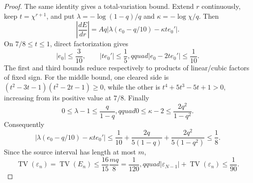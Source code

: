\begin{proof}
The same identity gives a total-variation bound.  Extend $r$ continuously,
keep $t=\chi^{r+1}$, and put
$\lambda=-\log(1-q)/q$ and $\kappa=-\log\chi/q$.  Then
\begin{equation}
 \left|\frac{dE}{dr}\right|
 =Aq\left|\lambda(e_0-q/10)-\kappa t e_0'\right|.
\end{equation}
On $7/8\le t\le1$, direct factorization gives
\begin{equation}
 |e_0|\le\frac3{10},\qquad |te_0'|\le\frac15,qquad
 |e_0-2te_0'|\le\frac1{10}.
\end{equation}
The first and third bounds reduce respectively to products of linear/cubic
factors of fixed sign.  For the middle bound, one cleared side is
$(t^2-3t-1)(t^2-2t-1)\ge0$, while the other is
$t^4+5t^3-5t+1>0$, increasing from its positive value at $7/8$.
Finally
\[
 0\le\lambda-1\le\frac q{1-q},qquad
 0\le\kappa-2\le\frac{2q^2}{1-q^2}.
\]
Consequently
\[
 \left|\lambda(e_0-q/10)-\kappa te_0'\right|
 \le\frac1{10}+\frac{2q}{5(1-q)}
 +\frac{2q^2}{5(1-q^2)}\le\frac18.
\]
Since the source interval has length at most $m$,
\begin{equation}
 \operatorname{TV}(\varepsilon_n)=\operatorname{TV}(E_n)
 \le \frac{16}{15}\frac{mq}{8}=\frac1{120},qquad
 |\varepsilon_{N-1}|+\operatorname{TV}(\varepsilon_n)\le\frac1{90}.
 \label{eq:terminal-modal-finite-epsilon-TV}
\end{equation}


\end{proof}
